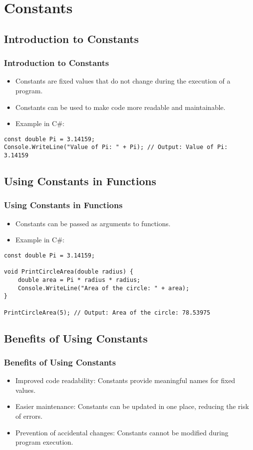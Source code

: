 \section{Constants}

\subsection{Introduction to Constants}
\begin{frame}[fragile]
\frametitle{Introduction to Constants}
\begin{itemize}
    \item Constants are fixed values that do not change during the execution of a program.
    \item Constants can be used to make code more readable and maintainable.
    \item Example in C\#:
\end{itemize}
\begin{lstlisting}
const double Pi = 3.14159;
Console.WriteLine("Value of Pi: " + Pi); // Output: Value of Pi: 3.14159
\end{lstlisting}
\end{frame}

\subsection{Using Constants in Functions}
\begin{frame}[fragile]
\frametitle{Using Constants in Functions}
\begin{itemize}
    \item Constants can be passed as arguments to functions.
    \item Example in C\#:
\end{itemize}
\begin{lstlisting}
const double Pi = 3.14159;

void PrintCircleArea(double radius) {
    double area = Pi * radius * radius;
    Console.WriteLine("Area of the circle: " + area);
}

PrintCircleArea(5); // Output: Area of the circle: 78.53975
\end{lstlisting}
\end{frame}

\subsection{Benefits of Using Constants}
\begin{frame}
\frametitle{Benefits of Using Constants}
\begin{itemize}
    \item Improved code readability: Constants provide meaningful names for fixed values.
    \item Easier maintenance: Constants can be updated in one place, reducing the risk of errors.
    \item Prevention of accidental changes: Constants cannot be modified during program execution.
\end{itemize}
\end{frame}

